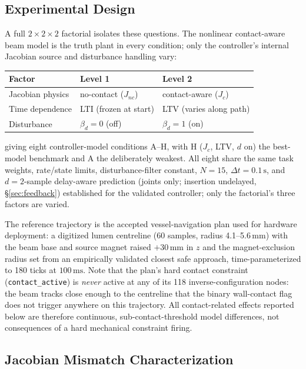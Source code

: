 \documentclass[journal]{IEEEtran}
\begin{document}
\subsection{Experimental Design}
\label{sec:mn-design}

A full $2\times2\times2$ factorial isolates these questions. The
nonlinear contact-aware beam model is the truth plant in every
condition; only the controller's internal Jacobian source and
disturbance handling vary:
\begin{center}
\begin{tabular}{@{}lll@{}}
\toprule
Factor & Level 1 & Level 2 \\
\midrule
Jacobian physics & no-contact ($J_{nc}$) & contact-aware ($J_c$) \\
Time dependence & LTI (frozen at start) & LTV (varies along path) \\
Disturbance & $\beta_d=0$ (off) & $\beta_d=1$ (on) \\
\bottomrule
\end{tabular}
\end{center}
giving eight controller-model conditions A--H, with H
($J_c$, LTV, $d$ on) the best-model benchmark and A the deliberately
weakest. All eight share the same task weights, rate/state limits,
disturbance-filter constant, $N=15$, $\Delta t=0.1\,\mathrm{s}$, and
$d=2$-sample delay-aware prediction (joints only; insertion
undelayed, \S\ref{sec:feedback}) established for the validated
controller; only the factorial's three factors are varied.

The reference trajectory is the accepted vessel-navigation plan used
for hardware deployment: a digitized lumen centreline (60 samples,
radius 4.1--5.6\,mm) with the beam base and source magnet raised
$+30\,\mathrm{mm}$ in $z$ and the magnet-exclusion radius set from an
empirically validated closest safe approach, time-parameterized to 180
ticks at $100\,\mathrm{ms}$. Note that the plan's hard contact
constraint (\texttt{contact\_active}) is \emph{never} active at any of
its 118 inverse-configuration nodes: the beam tracks close enough to
the centreline that the binary wall-contact flag does not trigger
anywhere on this trajectory. All contact-related effects reported
below are therefore continuous, sub-contact-threshold model
differences, not consequences of a hard mechanical constraint firing.

\subsection{Jacobian Mismatch Characterization}
\label{sec:mn-exp1}
\end{document}
